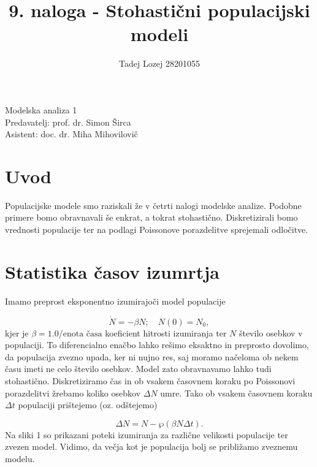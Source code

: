 \documentclass[slovene,11pt,a4paper]{article}
\begin{document}
\title{9. naloga - Stohastični populacijski modeli}
\author{Tadej Lozej 28201055}
\maketitle
\begin{center}
Modelska analiza 1 \\
\bigskip
Predavatelj: prof. dr. Simon Širca \\
Asistent: doc. dr. Miha Mihovilovič
\end{center}

\newpage

\tableofcontents

\newpage

\section{Uvod}


Populacijske modele smo raziskali že v četrti nalogi modelske analize. Podobne primere bomo obravnavali še enkrat, a tokrat stohastično. Diskretizirali bomo vrednosti populacije ter na podlagi Poissonove porazdelitve sprejemali odločitve.

\section{Statistika časov izumrtja}

Imamo preprost eksponentno izumirajoči model populacije

\begin{equation}
\dot{N} = -\beta N; \quad N(0) = N_0,
\end{equation}
kjer je $\beta = 1.0/\text{enota časa}$ koeficient hitrosti izumiranja ter $N$ število osebkov v populaciji. To diferencialno enačbo lahko rešimo eksaktno in preprosto dovolimo, da populacija zvezno upada, ker ni nujno res, saj moramo načeloma ob nekem času imeti ne celo število osebkov. Model zato obravnavamo lahko tudi stohastično. Diskretiziramo čas in ob vsakem časovnem koraku po Poissonovi porazdelitvi žrebamo koliko osebkov $\Delta N$ umre. Tako ob vsakem časovnem koraku $\Delta t$ populaciji prištejemo (oz. odštejemo)

\begin{equation}
\Delta N = N - \wp (\beta N \Delta t).
\end{equation}
Na sliki 1 so prikazani poteki izumiranja za različne velikosti populacije ter zvezen model. Vidimo, da večja kot je populacija bolj se približamo zveznemu modelu.
\end{document}
